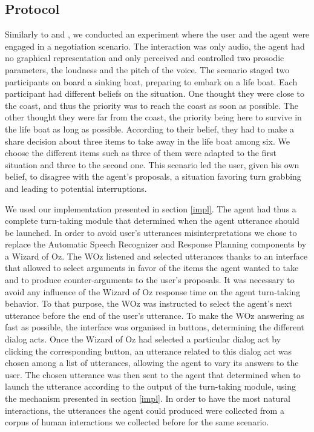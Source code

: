 \subsection{Protocol}

Similarly to \cite{de_vault_toward_2015} and \cite{skantze_towards_2010}, we conducted an experiment where the user and the agent were engaged in a negotiation scenario. The interaction was only audio, the agent had no graphical representation and only perceived and controlled two prosodic parameters, the loudness and the pitch of the voice. 
The scenario staged two participants on board a sinking boat, preparing to embark on a life boat. 
Each participant had different beliefs on the situation. 
One thought they were close to the coast, and thus the priority was to reach the coast as soon as possible. 
The other thought they were far from the coast, the priority being here to survive in the life boat as long as possible. 
According to their belief, they had to make a share decision about three items to take away in the life boat among six. We choose the different items such as three of them were adapted to the first situation 
and three to the second one.
This scenario led the user, given his own belief, to disagree with the agent's proposals, a situation favoring turn grabbing and leading to potential interruptions.   

We used our implementation presented in section \ref{impl}. The agent had thus a complete turn-taking module that determined when the agent utterance should be launched. In order to avoid user's utterances misinterpretations we chose to replace the Automatic Speech Recognizer and Response Planning components by a Wizard of Oz. The WOz listened and selected utterances thanks to an interface that allowed to select arguments in favor of the items the agent wanted to take and to produce counter-arguments to the user's proposals. It was necessary to avoid any influence of the Wizard of Oz response time on the agent turn-taking behavior. To that purpose, the WOz was instructed to select the agent's next utterance before the end of the user's utterance. 
To make the WOz answering as fast as possible, the interface was organised in buttons, determining the different dialog acts. Once the Wizard of Oz had selected a particular dialog act by clicking the corresponding button, an utterance related to this dialog act was chosen among a list of utterances, allowing the agent to vary its answers to the user. The chosen utterance was then sent to the agent that determined when to launch the utterance according to the output of the turn-taking module, using the mechanism presented in section \ref{impl}. In order to have the most natural interactions, the utterances the agent could produced were collected from a corpus of human interactions we collected before for the same scenario.

